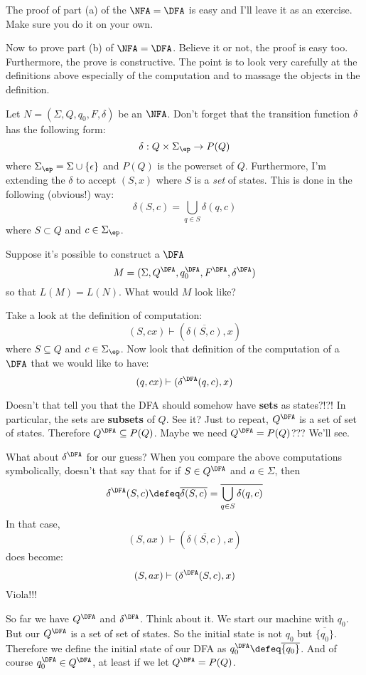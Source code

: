 The proof of part (a) of the $\NFA=\DFA$ is easy and I'll leave it as an
exercise. Make sure you do it on your own.

Now to prove part (b) of $\NFA=\DFA$. Believe it or not, the proof is
easy too. Furthermore, the prove is constructive. The point is to
look very carefully at the definitions above especially of the
computation and to massage the objects in the definition.

Let $N = (\Sigma,Q,q_0,F,\delta)$ be an $\NFA$. 
Don't forget that the transition function $\delta$ has the following form:
\[
\delta: Q \times \Sigma_\ep \rightarrow P(Q)
\] 
where $\Sigma_\ep = \Sigma \cup \{\epsilon\}$ and $P(Q)$ is the 
powerset of $Q$.
Furthermore, I'm extending the $\delta$ to accept $(S, x)$
where $S$ is a \textit{set} of states.
This is done in the following (obvious!) way:
\[
\delta(S, c) = \bigcup_{q \in S} \delta(q, c)
\]
where $S \subset Q$ and $c \in \Sigma_\ep$.

Suppose it's possible
to construct a $\DFA$ 
\[
M = (\Sigma,Q^{\DFA}, q_0^{\DFA}, F^{\DFA}, \delta^{\DFA})
\]
so that $L(M) = L(N)$. What would $M$ look like?

Take a look at the definition of computation:
\[
 (S,cx) \vdash (\overline{\delta(S,c)}, x)
\]
where $S \subseteq Q$ and $c \in \Sigma_\ep$.
Now look that definition of the computation of a $\DFA$
that we would like to have:
\[
 (q,cx) \vdash (\delta^{\DFA}(q,c),x)
\]

Doesn't that tell you that the DFA should somehow have
\textbf{sets}
as states?!?! In particular, the sets are
\textbf{subsets} of
$Q$. See it? Just to repeat, $Q^{\DFA}$ is a set of set of states.
Therefore $Q^{\DFA} \subseteq P(Q)$. Maybe we need $Q^{\DFA} =
P(Q)$??? We'll see.

What about $\delta^{\DFA}$ for our guess? When you compare the above
computations symbolically, doesn't that say that for if $S \in
Q^{\DFA}$ and $a\in \Sigma$, then
\[
 \delta^{\DFA}(S,c) 
\defeq \overline{\delta(S,c)}
= \overline{\bigcup_{q \in S} \delta(q,c)}
\]
In that case,
\[
 (S,ax) \vdash (\overline{\delta(S,c)}, x)
\]
does become:
\[
 (S,ax) \vdash (\delta^{\DFA}(S,c), x)
\]
Viola!!!

So far we have $Q^{\DFA}$ and $\delta^{\DFA}$. Think about it. We
start our machine with $q_0$. But our $Q^{\DFA}$ is a set of set of
states. So the initial state is not $q_0$ but $\overline{\{q_0\}}$. 
Therefore
we define the initial state of our DFA as $q_0^{\DFA} \defeq
\overline{\{q_0\}}$. 
And of course $q_0^{\DFA} \in Q^{\DFA}$, at least if we let
$Q^{\DFA} = P(Q)$.

